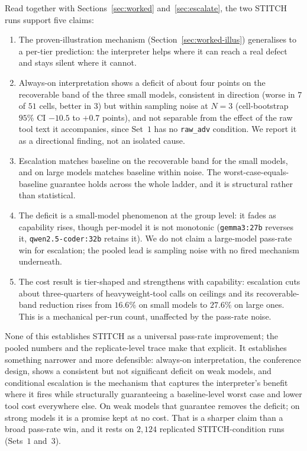 \documentclass[11pt]{article}
\begin{document}
Read together with Sections~\ref{sec:worked} and~\ref{sec:escalate}, the two
STITCH runs support five claims:
\begin{enumerate}[leftmargin=1.2em, itemsep=0.15em]
\item The proven-illustration mechanism (Section~\ref{sec:worked-illus})
generalises to a per-tier prediction: the interpreter helps where it can reach
a real defect and stays silent where it cannot.
\item Always-on interpretation shows a deficit of about four points on the
recoverable band of the three small models, consistent in direction (worse in
$7$ of $51$ cells, better in $3$) but within sampling noise at $N{=}3$
(cell-bootstrap $95\%$ CI $-10.5$ to $+0.7$ points), and not separable from
the effect of the raw tool text it accompanies, since Set~$1$ has no
\texttt{raw\_adv} condition. We report it as a directional finding, not an
isolated cause.
\item Escalation matches baseline on the recoverable band for the small
models, and on large models matches baseline within noise. The
worst-case-equals-baseline guarantee holds across the whole ladder, and it is
structural rather than statistical.
\item The deficit is a small-model phenomenon at the group level: it fades as
capability rises, though per-model it is not monotonic (\texttt{gemma3:27b}
reverses it, \texttt{qwen2.5-coder:32b} retains it). We do not claim a
large-model pass-rate win for escalation; the pooled lead is sampling noise
with no fired mechanism underneath.
\item The cost result is tier-shaped and strengthens with capability:
escalation cuts about three-quarters of heavyweight-tool calls on ceilings and
its recoverable-band reduction rises from $16.6\%$ on small models to $27.6\%$
on large ones. This is a mechanical per-run count, unaffected by the pass-rate
noise.
\end{enumerate}
None of this establishes STITCH as a universal pass-rate improvement; the
pooled numbers and the replicate-level trace make that explicit. It establishes
something narrower and more defensible: always-on interpretation, the
conference design, shows a consistent but not significant deficit on weak
models, and conditional escalation is the mechanism that captures the
interpreter's benefit where it fires while structurally guaranteeing a
baseline-level worst case and lower tool cost everywhere else. On weak models
that guarantee removes the deficit; on strong models it is a promise kept at no
cost. That is a sharper claim than a broad pass-rate win, and it rests on
$2{,}124$ replicated STITCH-condition runs (Sets~$1$ and~$3$).
\end{document}
